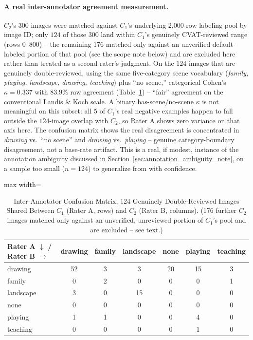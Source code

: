 \documentclass[12pt,a4paper]{report}
\begin{document}
\paragraph{A real inter-annotator agreement measurement.} $C_2$'s 300 images were matched against $C_1$'s underlying 2,000-row labeling pool by image ID; only $124$ of those 300 land within $C_1$'s genuinely CVAT-reviewed range (rows $0$--$800$) -- the remaining $176$ matched only against an unverified default-labeled portion of that pool (see the scope note below) and are excluded here rather than treated as a second rater's judgment. On the $124$ images that are genuinely double-reviewed, using the same five-category scene vocabulary (\textit{family, playing, landscape, drawing, teaching}) plus ``no scene,'' categorical Cohen's~\cite{cohen1960kappa} $\kappa = 0.337$ with $83.9\%$ raw agreement (Table~\ref{tab:iaa_confusion}) -- ``fair'' agreement on the conventional Landis \& Koch scale. A binary has-scene/no-scene $\kappa$ is not meaningful on this subset: all $5$ of $C_1$'s real negative examples happen to fall outside the $124$-image overlap with $C_2$, so Rater A shows zero variance on that axis here. The confusion matrix shows the real disagreement is concentrated in \textit{drawing} vs.\ ``no scene'' and \textit{drawing} vs.\ \textit{playing} -- genuine category-boundary disagreement, not a base-rate artifact. This is a real, if modest, instance of the annotation ambiguity discussed in Section~\ref{sec:annotation_ambiguity_note}, on a sample too small ($n=124$) to generalize from with confidence.

\begin{table}[!htbp]
\centering
\caption[Inter-Annotator Confusion Matrix, 124 Double-Reviewed Images]{Inter-Annotator Confusion Matrix, 124 Genuinely Double-Reviewed Images Shared Between $C_1$ (Rater A, rows) and $C_2$ (Rater B, columns). (176 further $C_2$ images matched only against an unverified, unreviewed portion of $C_1$'s pool and are excluded -- see text.)}
\label{tab:iaa_confusion}
\begin{adjustbox}{max width=\linewidth}
\begin{tabular}{lcccccc}
\toprule
\textbf{Rater A $\downarrow$ / Rater B $\rightarrow$} & \textbf{drawing} & \textbf{family} & \textbf{landscape} & \textbf{none} & \textbf{playing} & \textbf{teaching} \\
\midrule
drawing & 52 & 3 & 3 & 20 & 15 & 3 \\
family & 0 & 2 & 0 & 0 & 0 & 1 \\
landscape & 3 & 0 & 15 & 0 & 0 & 0 \\
none & 0 & 0 & 0 & 0 & 0 & 0 \\
playing & 1 & 1 & 0 & 0 & 4 & 0 \\
teaching & 0 & 0 & 0 & 0 & 1 & 0 \\
\bottomrule
\end{tabular}
\end{adjustbox}
\end{table}
\end{document}
